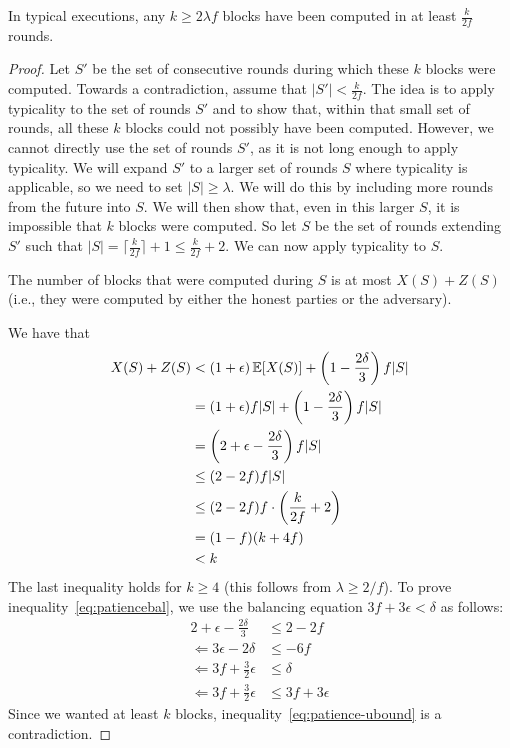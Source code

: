 \begin{lemma}\label{lem:patience}
In typical executions, any $k \geq 2\lambda f$ blocks have been computed in at least $\frac{k}{2f}$ rounds.
\end{lemma}
\begin{proof}
Let $S'$ be the set of consecutive rounds during which these $k$ blocks were computed. Towards a contradiction, assume that $|S'| < \frac{k}{2f}$. The idea is to apply typicality to the set of rounds $S'$ and to show that, within that small set of rounds, all these $k$ blocks could not possibly have been computed. However, we cannot directly use the set of rounds $S'$, as it is not long enough to apply typicality. We will expand $S'$ to a larger set of rounds $S$ where typicality is applicable, so we need to set $|S| \geq \lambda$. We will do this by including more rounds from the future into $S$. We will then show that, even in this larger $S$, it is impossible that $k$ blocks were computed. So let $S$ be the set of rounds extending $S'$ such that $|S| = \lceil \frac{k}{2f} \rceil + 1 \leq \frac{k}{2f} + 2$. We can now apply typicality to $S$.

The number of blocks that were computed during $S$ is at most $X(S) + Z(S)$ (i.e., they were computed by either the honest parties or the adversary).

We have that
\begin{align}
    X(S) + Z(S) &< (1+\epsilon)\operatorname{\mathbb{E}}[X(S)] + \left(1 - \frac{2\delta}{3}\right)f|S|\\
    &=(1+\epsilon)f|S|+ \left(1 - \frac{2\delta}{3}\right)f|S|\\
    &= \left(2 + \epsilon - \frac{2\delta}{3}\right)f|S|\\
    &\leq (2-2f)f|S|\label{eq:patiencebal}\\
    & \leq (2-2f)f \cdot \left(\frac{k}{2f} + 2\right)\\
    & = (1-f)(k+4f) \\
    & < k\label{eq:patience-ubound}
\end{align}
The last inequality holds for $k \geq 4$ (this follows from $\lambda \geq 2/f$).
To prove inequality~\ref{eq:patiencebal}, we use the balancing equation $3f + 3\epsilon < \delta$ as follows:
\begin{align}
  2 + \epsilon - \frac{2\delta}{3} &\leq 2-2f\\
  \Leftarrow 3\epsilon - 2\delta &\leq -6f\\
  \Leftarrow 3f + \frac{3}{2}\epsilon &\leq \delta\\
  \Leftarrow 3f + \frac{3}{2}\epsilon &\leq 3f + 3\epsilon
\end{align}
Since we wanted at least $k$ blocks, inequality~\ref{eq:patience-ubound} is a contradiction.
\end{proof}

